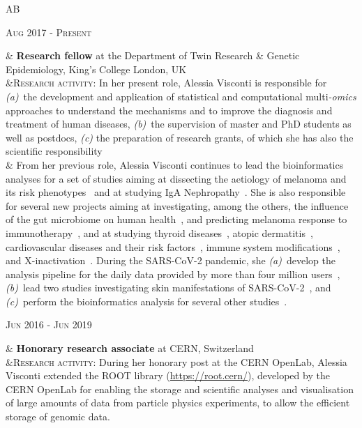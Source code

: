 \documentclass[a4paper,10pt]{article}
\newenvironment{doubletablelist}
{
	\vspace{-0.2cm}
	\begin{longtable}[!h]{AB}}{\end{longtable}
}
\newcommand{\dtlist}[2]{
\hspace{-3cm}
\noindent
	\begin{minipage}{0.22\textwidth}
	\begin{flushright}
	\textsc{#1}
	\end{flushright}
	\end{minipage}
	& #2\\[0.2cm]
}
\begin{document}
\begin{doubletablelist}
    
	\dtlist{Aug 2017 - Present}{\textbf{Research fellow} at the Department of Twin Research \& Genetic Epidemiology, King's College London, UK \\	
	 &\textsc{Research activity}: In her present role, Alessia Visconti is responsible for \emph{(a)}~the development and application of statistical and computational multi\emph{-omics} approaches to understand the mechanisms and to improve the diagnosis and treatment of human diseases, \emph{(b)}~the supervision of master and PhD students as well as postdocs, \emph{(c)} the preparation of research grants, of which she has also the scientific responsibility\\
	  & From her previous role, Alessia Visconti continues to lead the bioinformatics analyses for a set of studies aiming at dissecting the aetiology of melanoma and its risk phenotypes~\cite{Vis19a,Vis20,Lan20,San20} and at studying IgA Nephropathy~\cite{Dot21}. She is also responsible for several new projects aiming at investigating, among the others, the influence of the gut microbiome on human health~\cite{Vis19,Bar20,LeR22,Zha22,Val23,Lou23,Nog23a,Nog23b}, and predicting melanoma response to immunotherapy~\cite{Ros22,Vis23}, and at studying thyroid diseases~\cite{Mar20}, atopic dermatitis~\cite{Gro21,Bud22}, cardiovascular diseases and their risk factors~\cite{Ros21}, immune system modifications~\cite{Pia21}, and X-inactivation~\cite{Zit23}. During the SARS-CoV-2 pandemic, she \emph{(a)}~develop the analysis pipeline for the daily data provided by more than four million users~\cite{Mur21}, \emph{(b)}~lead two studies investigating skin manifestations of SARS-CoV-2~\cite{Vis21, Vis22}, and \emph{(c)}~perform the bioinformatics analysis for several other studies~\cite{Men20,Lee20,Zaz20,Hop21,Wil21,Sud21}. %
	}
	
	
    \dtlist{Jun 2016 - Jun 2019}{\textbf{Honorary research associate} at CERN, Switzerland \\
	 &\textsc{Research activity}: During her honorary post at the CERN OpenLab, Alessia Visconti extended the ROOT library (\url{https://root.cern/}), developed by the CERN OpenLab for enabling the storage and scientific analyses and visualisation of large amounts of data from particle physics experiments, to allow the efficient storage of genomic data. %
	}
    

\end{doubletablelist}
\end{document}
